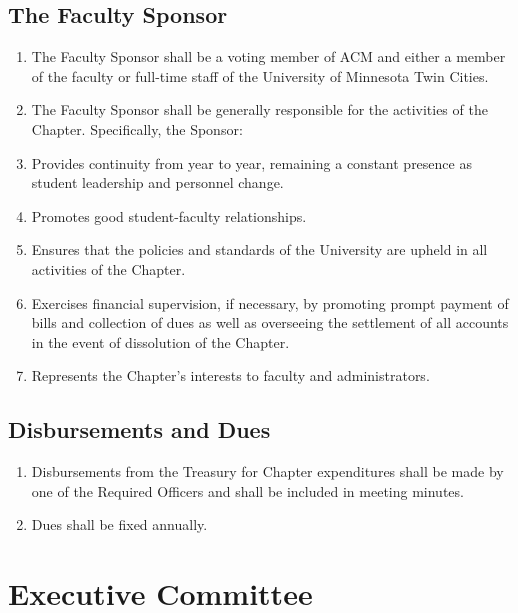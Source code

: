 \subsection{The Faculty Sponsor}
\begin{enumerate}
	\item The Faculty Sponsor shall be a voting member of ACM and either a member of the faculty or full-time staff of the University of Minnesota Twin Cities.
	\item The Faculty Sponsor shall be generally responsible for the activities of the Chapter. Specifically, the Sponsor:
	\item Provides continuity from year to year, remaining a constant presence as student leadership and personnel change.
	\item Promotes good student-faculty relationships.
	\item Ensures that the policies and standards of the University are upheld in all activities of the Chapter.
	\item Exercises financial supervision, if necessary, by promoting prompt payment of bills and collection of dues as well as overseeing the settlement of all accounts in the event of dissolution of the Chapter.
	\item Represents the Chapter’s interests to faculty and administrators.
\end{enumerate}

\subsection{Disbursements and Dues}
\begin{enumerate}
	\item Disbursements from the Treasury for Chapter expenditures shall be made by one of the Required Officers and shall be included in meeting minutes.
	\item Dues shall be fixed annually.
\end{enumerate}

\section{Executive Committee}

